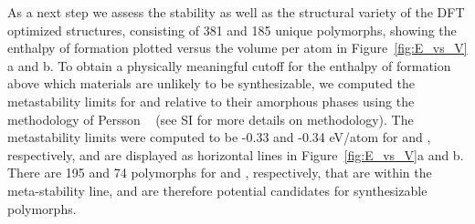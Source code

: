 
As a next step we assess the stability as well as the structural variety of the DFT optimized structures, consisting of 381 \IrOtwo and 185 \IrOthree unique polymorphs, showing the enthalpy of formation plotted versus the volume per atom in Figure~\ref{fig:E_vs_V} a and b.
%
To obtain a physically meaningful cutoff for the enthalpy of formation above which materials are unlikely to be synthesizable, we computed the metastability limits for \IrOtwo and \IrOthree relative to their amorphous phases using the methodology of Persson ~\cite{Aykol2018} (see SI for more details on methodology).
%
The metastability limits were computed to be -0.33 and -0.34 eV/atom for \IrOtwo and \IrOthree, respectively,
and are displayed as horizontal lines in Figure~\ref{fig:E_vs_V}a and b. There are 195 and 74 polymorphs for \IrOtwo and \IrOthree, respectively, that are within the meta-stability line, and are therefore potential candidates for synthesizable polymorphs.
%
%

